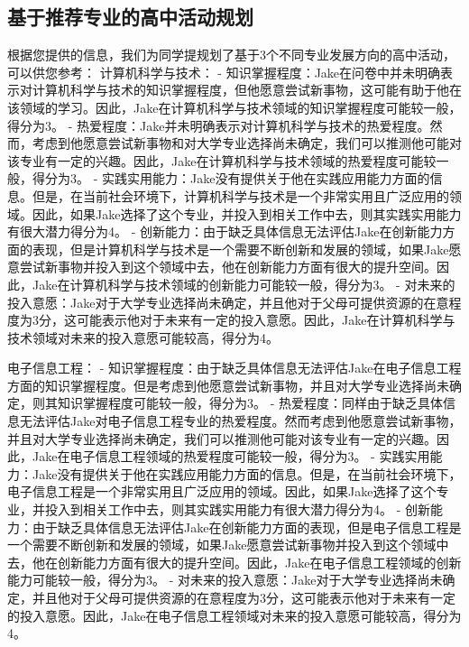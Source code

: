 \documentclass[12pt]{article}
\begin{document}
\begin{CJK*}{UTF8}{gbsn}
   
   
   \subsection*{基于推荐专业的高中活动规划}
   根据您提供的信息，我们为同学提规划了基于3个不同专业发展方向的高中活动，可以供您参考：
   计算机科学与技术：
- 知识掌握程度：Jake在问卷中并未明确表示对计算机科学与技术的知识掌握程度，但他愿意尝试新事物，这可能有助于他在该领域的学习。因此，Jake在计算机科学与技术领域的知识掌握程度可能较一般，得分为3。
- 热爱程度：Jake并未明确表示对计算机科学与技术的热爱程度。然而，考虑到他愿意尝试新事物和对大学专业选择尚未确定，我们可以推测他可能对该专业有一定的兴趣。因此，Jake在计算机科学与技术领域的热爱程度可能较一般，得分为3。
- 实践实用能力：Jake没有提供关于他在实践应用能力方面的信息。但是，在当前社会环境下，计算机科学与技术是一个非常实用且广泛应用的领域。因此，如果Jake选择了这个专业，并投入到相关工作中去，则其实践实用能力有很大潜力得分为4。
- 创新能力：由于缺乏具体信息无法评估Jake在创新能力方面的表现，但是计算机科学与技术是一个需要不断创新和发展的领域，如果Jake愿意尝试新事物并投入到这个领域中去，他在创新能力方面有很大的提升空间。因此，Jake在计算机科学与技术领域的创新能力可能较一般，得分为3。
- 对未来的投入意愿：Jake对于大学专业选择尚未确定，并且他对于父母可提供资源的在意程度为3分，这可能表示他对于未来有一定的投入意愿。因此，Jake在计算机科学与技术领域对未来的投入意愿可能较高，得分为4。

电子信息工程：
- 知识掌握程度：由于缺乏具体信息无法评估Jake在电子信息工程方面的知识掌握程度。但是考虑到他愿意尝试新事物，并且对大学专业选择尚未确定，则其知识掌握程度可能较一般，得分为3。
- 热爱程度：同样由于缺乏具体信息无法评估Jake对电子信息工程专业的热爱程度。然而考虑到他愿意尝试新事物，并且对大学专业选择尚未确定，我们可以推测他可能对该专业有一定的兴趣。因此，Jake在电子信息工程领域的热爱程度可能较一般，得分为3。
- 实践实用能力：Jake没有提供关于他在实践应用能力方面的信息。但是，在当前社会环境下，电子信息工程是一个非常实用且广泛应用的领域。因此，如果Jake选择了这个专业，并投入到相关工作中去，则其实践实用能力有很大潜力得分为4。
- 创新能力：由于缺乏具体信息无法评估Jake在创新能力方面的表现，但是电子信息工程是一个需要不断创新和发展的领域，如果Jake愿意尝试新事物并投入到这个领域中去，他在创新能力方面有很大的提升空间。因此，Jake在电子信息工程领域的创新能力可能较一般，得分为3。
- 对未来的投入意愿：Jake对于大学专业选择尚未确定，并且他对于父母可提供资源的在意程度为3分，这可能表示他对于未来有一定的投入意愿。因此，Jake在电子信息工程领域对未来的投入意愿可能较高，得分为4。


\end{CJK*}
\end{document}
